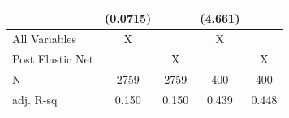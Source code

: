 {\begin{tabular}{l*{4}{c}}
                    &    (0.0715)        &                    &     (4.661)        &                    \\
\midrule
All Variables       &           X        &                    &           X        &                    \\
Post Elastic Net    &                    &           X        &                    &           X        \\
N                   &        2759        &        2759        &         400        &         400        \\
adj. R-sq           &       0.150        &       0.150        &       0.439        &       0.448        \\
\bottomrule
\end{tabular}
}

